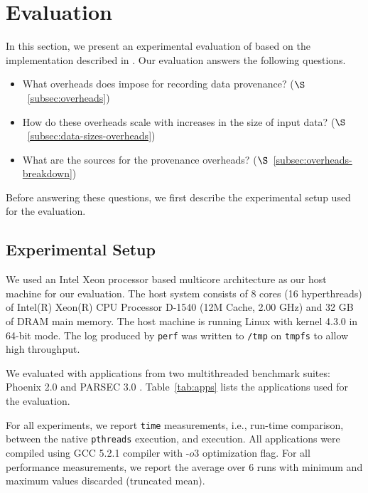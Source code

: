 \section{Evaluation}
\label{sec:evaluation}

In this section, we present an experimental evaluation of \projecttitle based on the implementation described in  . Our evaluation answers the following questions.

\begin{itemize}
\item What overheads does \projecttitle impose for recording data provenance? ($\S$~\ref{subsec:overheads})
\item How do these overheads scale with increases in the size of input data? ($\S$~\ref{subsec:data-sizes-overheads})
\item What are the sources for the provenance overheads? ($\S$~\ref{subsec:overheads-breakdown})
\end{itemize}

Before answering these questions, we first describe the experimental setup used for the evaluation.

\subsection{Experimental Setup}


 We used an Intel Xeon processor based
multicore architecture as our host machine for our evaluation. The
host system consists of 8 cores (16 hyperthreads) of Intel(R) Xeon(R) CPU Processor D-1540
(12M Cache, 2.00 GHz) and 32 GB of DRAM main memory. The host
machine is running Linux with kernel 4.3.0 in 64-bit mode. The log produced by
{\tt perf} was written to {\tt /tmp} on {\tt tmpfs} to allow high throughput.


  We evaluated \projecttitle with applications from two multithreaded benchmark suites: Phoenix 2.0 \cite{phoenix} and PARSEC 3.0 \cite{parsec}. Table~\ref{tab:apps} lists the applications used for the evaluation.%


  For all experiments,  we report {\tt time}
measurements, i.e., run-time comparison, between the native {\tt pthreads}
execution, and \projecttitle execution.  All applications were compiled using
GCC 5.2.1 compiler with -$o3$ optimization flag. For all performance
measurements, we report the average over 6 runs with minimum and maximum values
discarded (truncated mean).


